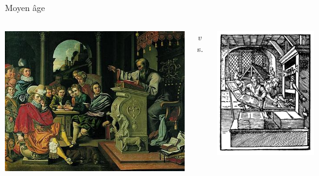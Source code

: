 \begin{frame}{Moyen âge}
\begin{columns}
	\begin{column}{0.40\linewidth}
		\centering
		\includegraphics[height=0.35\paperheight]{../resources/illustrations/lecture} \\
	\end{column}
	\begin{column}{0.09\linewidth} \centering \huge \emph vs. \end{column}
	\begin{column}{0.40\linewidth}
		\centering
		\includegraphics[height=0.35\paperheight]{../resources/illustrations/gutenberg} \\
	\end{column}
\end{columns}
\begin{columns}

\end{columns}
\end{frame}
